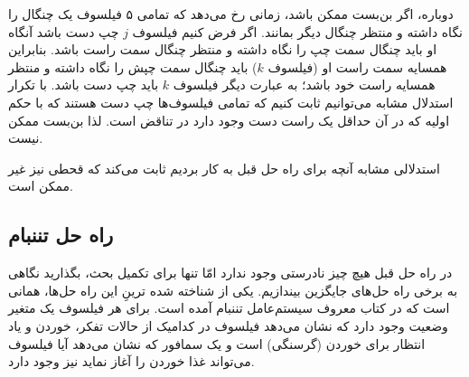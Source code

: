 \documentclass{book}
\newcommand{\clearemptydoublepage}{\newpage\cleardoublepage}
\begin{document}
    دوباره، اگر بن‌بست ممکن باشد، زمانی رخ می‌دهد که تمامی ۵ فیلسوف یک چنگال را نگاه داشته و منتظر چنگال دیگر بمانند. 
    اگر فرض کنیم فیلسوف $j$ چپ دست باشد آنگاه او باید چنگال سمت چپ را نگاه داشته و منتظر چنگال سمت راست باشد. 
    بنابراین همسایه سمت راست او (فیلسوف $k$) باید چنگال سمت چپش را نگاه داشته و منتظر همسایه راست خود باشد؛ به عبارت دیگر 
    فیلسوف $k$ باید چپ دست باشد. با تکرار استدلال مشابه می‌توانیم ثابت کنیم که تمامی فیلسوف‌ها چپ دست هستند که با حکم اولیه که در آن 
    حداقل یک راست دست وجود دارد در تناقض است. لذا بن‌بست ممکن نیست. 

    استدلالی مشابه آنچه برای راه حل قبل به کار بردیم ثابت می‌کند که قحطی نیز غیر ممکن است. 


\clearemptydoublepage
\subsection{راه حل تننبام}

    در راه حل قبل هیچ چیز نادرستی وجود ندارد امّا تنها برای تکمیل بحث، بگذارید نگاهی به برخی راه حل‌های جایگزین بیندازیم. 
    یکی از شناخته‌ شده ترینِ  این راه حل‌ها، همانی است که در کتاب معروف سیستم‌عامل تننبام آمده است\cite{tanenbaum}. 
    برای هر فیلسوف یک متغیر وضعیت وجود دارد که نشان می‌دهد فیلسوف در کدامیک از حالات تفکر، خوردن و یاد انتظار برای خوردن (گرسنگی) است و 
    یک سمافور که نشان می‌دهد آیا فیلسوف می‌تواند غذا خوردن را آغاز نماید نیز وجود دارد. 
\end{document}
